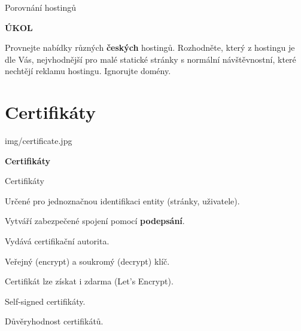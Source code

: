 \documentclass[aspectratio=1610]{beamer}
\begin{document}
\begin{frame}{Porovnání hostingů}
    \begin{cardTiny}
        \begin{center}
            \textbf{ÚKOL}
        \end{center}
        \begin{flushleft}
            Provnejte nabídky různých \textbf{českých} hostingů. Rozhodněte, který z hostingu je dle Vás, nejvhodnější pro malé statické stránky s normální návštěvnostní, které nechtějí reklamu hostingu. Ignorujte domény. 
        \end{flushleft}
    \end{cardTiny}
\end{frame}



\section{Certifikáty}

\begin{frameImg}[width]{img/certificate.jpg}
    \vspace*{60mm}
    \begin{cardTiny}
        \vspace*{\fill}
        \begin{center}
            \textbf{Certifikáty}
        \end{center}
    \end{cardTiny}
\end{frameImg}

\begin{frame}{Certifikáty}
    \begin{cardTiny}
        \begin{flushleft}
            Určené pro jednoznačnou identifikaci entity (stránky, uživatele).
            
            Vytváří zabezpečené spojení pomocí \textbf{podepsání}.

            \vspace{2ex}

            Vydává certifikační autorita.

            Veřejný (encrypt) a soukromý (decrypt) klíč. 

            Certifikát lze získat i zdarma (Let's Encrypt). 
            
            \vspace{2ex}

            Self-signed certifikáty.

            Důvěryhodnost certifikátů.
        \end{flushleft}
    \end{cardTiny}
\end{frame}
\end{document}
